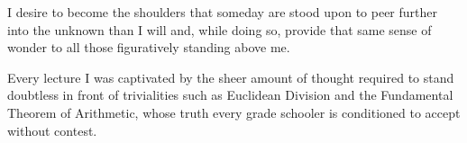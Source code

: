 \documentclass[12pt]{article}
\begin{document}
I desire to become the shoulders that someday are stood upon to peer further into the unknown than I will and, while doing so, provide that same sense of wonder to all those figuratively standing above me.


Every lecture I was captivated by the sheer amount of thought required to stand doubtless in front of trivialities such as Euclidean Division and the Fundamental Theorem of Arithmetic, whose truth every grade schooler is conditioned to accept without contest.
\end{document}
